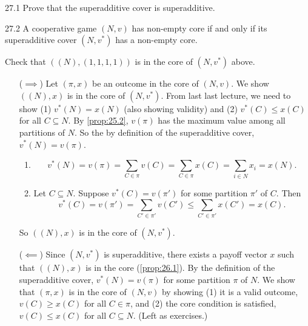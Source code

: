 \documentclass[12pt,letterpaper]{report}
\begin{document}
\begin{exer}{}{27.1}
  Prove that the superadditive cover is superadditive.
\end{exer}

\begin{prop}{}{27.2}
  A cooperative game $(N, v)$ has non-empty core if and only if its superadditive cover $(N, v^*)$
  has a non-empty core.
\end{prop}

\begin{ex}
  Check that $((N), (1, 1, 1, 1))$ is in the core of $(N, v^*)$ above.
\end{ex}

\begin{thmproof}
  \begin{itemize}[leftmargin=4em]
    \item[($\implies$)]
    Let $(\pi, x)$ be an outcome in the core of $(N, v)$.
    We show $((N), x)$ is in the core of $(N, v^*)$.
    From last last lecture, we need to show (1) $v^*(N) = x(N)$ (also showing validity) and (2)
    $v^*(C) \leq x(C)$ for all $C \subseteq N$.
    By \cref{prop:25.2}, $v(\pi)$ has the maximum value among all partitions of $N$.
    So the by definition of the superadditive cover, $v^*(N) = v(\pi)$.
    \begin{enumerate}[label=(\arabic*)]
      \item
      \[
        v^*(N) = v(\pi) = \sum_{C \in \pi} v(C) = \sum_{C \in \pi} x(C) = \sum_{i \in N} x_i = x(N).
      \]
      \item
      Let $C \subseteq N$.
      Suppose $v^*(C) = v(\pi')$ for some partition $\pi'$ of $C$.
      Then
      \[
        v^*(C) = v(\pi') = \sum_{C' \in \pi'} v(C') \leq \sum_{C' \in \pi'} x(C') = x(C).
      \]
    \end{enumerate}
    So $((N), x)$ is in the core of $(N, v^*)$.

    \item[($\impliedby$)]
    Since $(N, v^*)$ is superadditive, there exists a payoff vector $x$ such that $((N), x)$ is in
    the core (\cref{prop:26.1}).
    By the definition of the superadditive cover, $v^*(N) = v(\pi)$ for some partition $\pi$ of $N$.
    We show that $(\pi, x)$ is in the core of $(N, v)$ by showing (1) it is a valid outcome,
    $v(C) \geq x(C)$ for all $C \in \pi$, and (2) the core condition is satisfied, $v(C) \leq x(C)$
    for all $C \subseteq N$.
    (Left as exercises.)
  \end{itemize}
\end{thmproof}
\end{document}
